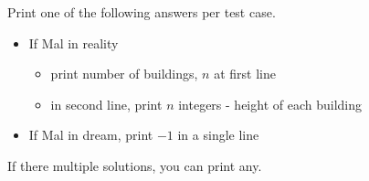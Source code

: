 Print one of the following answers per test case.
\begin{itemize}
\item If Mal in reality
\begin{itemize}
\item print number of buildings, $n$ at first line
\item in second line, print $n$ integers - height of each building
\end{itemize}
\item If Mal in dream, print $-1$ in a single line
\end{itemize}

If there multiple solutions, you can print any.